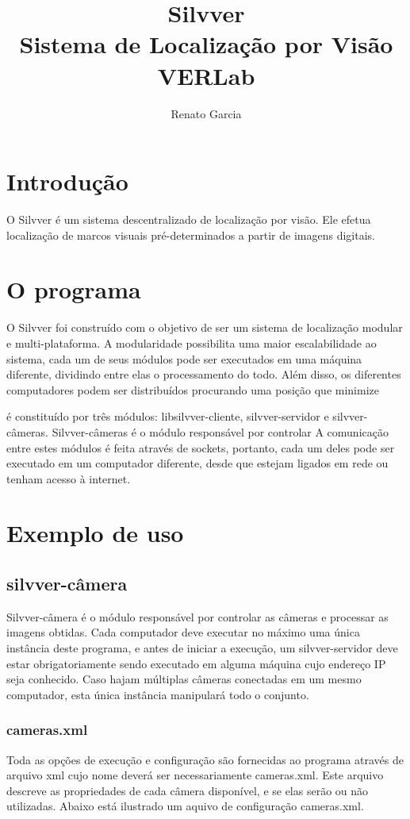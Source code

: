 \documentclass[a4paper,10pt]{article}
\title {Silvver \\ Sistema de Localização por Visão VERLab}
\author{Renato Garcia}
\date{}
\begin{document}
\maketitle

\section{Introdução}
O Silvver é um sistema descentralizado de localização por visão. Ele
efetua localização de marcos visuais pré-determinados a partir de
imagens digitais.


\section{O programa}
O Silvver foi construído com o objetivo de ser um sistema de
localização modular e multi-plataforma. A modularidade possibilita uma
maior escalabilidade ao sistema, cada um de seus módulos pode ser
executados em uma máquina diferente, dividindo entre elas o
processamento do todo. Além disso, os diferentes computadores podem
ser distribuídos procurando uma posição que minimize

é constituído por três módulos: libsilvver-cliente, silvver-servidor e
silvver-câmeras. Silvver-câmeras é o módulo responsável por controlar
A comunicação entre estes módulos é feita através de sockets,
portanto, cada um deles pode ser executado em um computador diferente,
desde que estejam ligados em rede ou tenham acesso à internet.

\section{Exemplo de uso}
\subsection{silvver-câmera}
Silvver-câmera é o módulo responsável por controlar as câmeras e
processar as imagens obtidas. Cada computador deve executar no máximo
uma única instância deste programa, e antes de iniciar a execução, um
silvver-servidor deve estar obrigatoriamente sendo executado em alguma
máquina cujo endereço IP seja conhecido. Caso hajam múltiplas câmeras
conectadas em um mesmo computador, esta única instância manipulará
todo o conjunto.

\subsubsection{cameras.xml}
Toda as opções de execução e configuração são fornecidas ao programa
através de arquivo xml cujo nome deverá ser necessariamente
cameras.xml. Este arquivo descreve as propriedades de cada câmera
disponível, e se elas serão ou não utilizadas. Abaixo está ilustrado
um aquivo de configuração cameras.xml.
\end{document}
